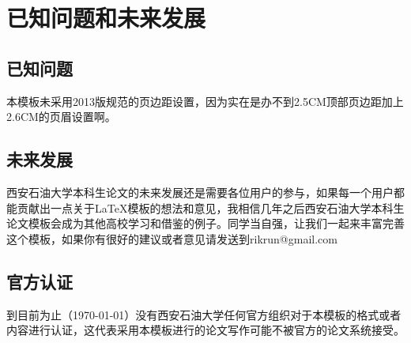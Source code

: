 \section{已知问题和未来发展}
\subsection{已知问题}
本模板未采用2013版规范的页边距设置，因为实在是办不到2.5CM顶部页边距加上2.6CM的页眉设置啊。
\subsection{未来发展}
西安石油大学本科生论文的未来发展还是需要各位用户的参与，如果每一个用户都能贡献出一点关于\LaTeX 模板的想法和意见，我相信几年之后西安石油大学本科生论文模板会成为其他高校学习和借鉴的例子。同学当自强，让我们一起来丰富完善这个模板，如果你有很好的建议或者意见请发送到rikrun@gmail.com
\subsection{官方认证}
到目前为止（\today ）没有西安石油大学任何官方组织对于本模板的格式或者内容进行认证，这代表采用本模板进行的论文写作可能不被官方的论文系统接受。